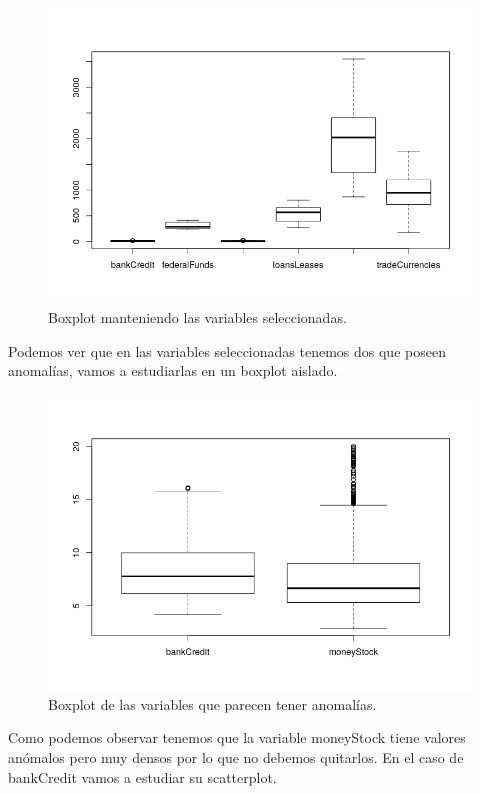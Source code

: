 \documentclass[12pt,a4paper]{article}
\begin{document}
\begin{figure}[H]
	\centering
	\includegraphics[scale=0.8]{./Imagenes/boxplot_filtrado3.png}
	\caption{Boxplot manteniendo las variables seleccionadas.}
\end{figure}

Podemos ver que en las variables seleccionadas tenemos dos que poseen anomalías, vamos a estudiarlas en un boxplot aislado.

\begin{figure}[H]
	\centering
	\includegraphics[scale=0.8]{./Imagenes/boxplot_filtrado4.png}
	\caption{Boxplot de las variables que parecen tener anomalías.}
\end{figure}

Como podemos observar tenemos que la variable moneyStock tiene valores anómalos pero muy densos por lo que no debemos quitarlos. En el caso de bankCredit vamos a estudiar su scatterplot.
\end{document}
